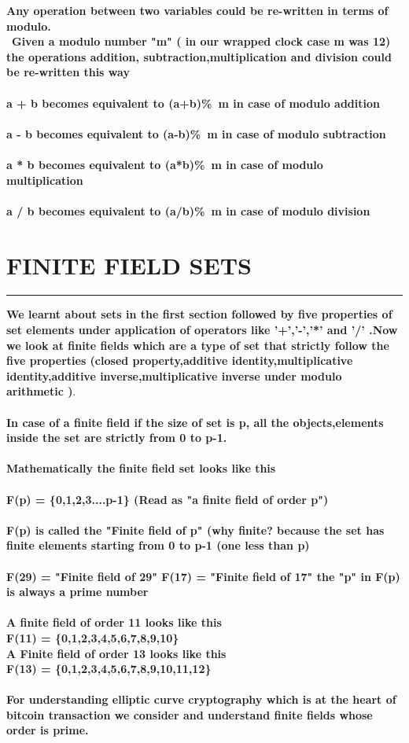 \documentclass{article}
\begin{document}
\textbf {Any operation between two variables could be re-written in terms of modulo.}
\\
\
\textbf{Given a modulo number "m" ( in our wrapped clock case m was 12) the operations addition, subtraction,multiplication and division could be re-written this way}
\\
\\
\textbf{ a + b  becomes equivalent to (a+b)\%\ m in case of modulo addition}
\\
\\
\textbf { a - b becomes equivalent to (a-b)\%\ m in case of modulo subtraction }
\\
\\
\textbf { a * b becomes equivalent to (a*b)\%\ m in case of modulo multiplication}
\\
\\
\textbf { a / b becomes equivalent to (a/b)\%\ m in case of modulo division }

\pagebreak 
\section * {FINITE FIELD SETS}
\hrule
\bigskip
\textbf{ We learnt about sets in the first section followed by five  properties of set elements under application of operators like '+','-','*' and '/' .Now we look at finite fields which are a type of set that strictly follow the five properties (closed property,additive identity,multiplicative identity,additive inverse,multiplicative inverse under modulo arithmetic  )}.
\\
\\
\textbf{ In case of a finite field if the size of set is p, all the objects,elements inside the set are strictly from 0 to p-1.\\ \\ Mathematically the finite field set looks like this \\ \\
F(p) = \{0,1,2,3....p-1\} (Read as "a finite field of order  p")
\\ \\
F(p) is called the "Finite field of p" (why finite? because the set has finite elements starting from 0 to p-1 (one less than p)
\\\\ 
F(29) = "Finite field of 29"
F(17) = "Finite field of 17"
the "p" in F(p) is always a prime number 
\\ \\
A finite field of order 11 looks like this \\
F(11) = \{0,1,2,3,4,5,6,7,8,9,10\} \\
A Finite field of order 13 looks like this \\
F(13) = \{0,1,2,3,4,5,6,7,8,9,10,11,12\}
\\
\\
For understanding elliptic curve cryptography which is at the heart of bitcoin transaction we consider and understand finite fields whose order is prime.
}
\pagebreak 
\end{document}
